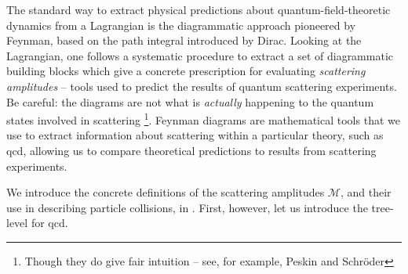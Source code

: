 The standard way to extract physical predictions about quantum-field-theoretic dynamics from a Lagrangian is the diagrammatic approach pioneered by Feynman, based on the path integral introduced by Dirac.
%
Looking at the Lagrangian, one follows a systematic procedure to extract a set of diagrammatic building blocks which give a concrete prescription for evaluating \textit{scattering amplitudes} -- tools used to predict the results of quantum scattering experiments.
%
Be careful:
%
the diagrams are not what is \textit{actually} happening to the quantum states involved in scattering%
\footnote{
    Though they do give fair intuition -- see, for example, Peskin and Schr\"oder \sam{}
}.
%
Feynman diagrams are mathematical tools that we use to extract information about scattering within a particular theory, such as \gls{qcd}, allowing us to compare theoretical predictions to results from scattering experiments.


We introduce the concrete definitions of the scattering amplitudes \(\mathcal{M}\), and their use in describing particle collisions, in .
%
First, however, let us introduce the tree-level  for \gls{qcd}.






